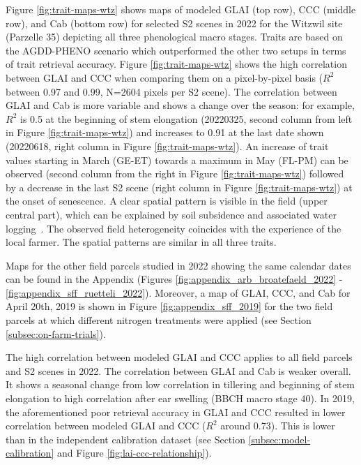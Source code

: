 Figure \ref{fig:trait-maps-wtz} shows maps of modeled GLAI (top row), CCC (middle row), and Cab (bottom row) for selected S2 scenes in 2022 for the Witzwil site (Parzelle 35) depicting all three phenological macro stages. Traits are based on the AGDD-PHENO scenario which outperformed the other two setups in terms of trait retrieval accuracy. Figure \ref{fig:trait-maps-wtz} shows the high correlation between GLAI and CCC when comparing them on a pixel-by-pixel basis ($R^2$ between 0.97 and 0.99, N=2604 pixels per S2 scene). The correlation between GLAI and Cab is more variable and shows a change over the season: for example, $R^2$ is 0.5 at the beginning of stem elongation (20220325, second column from left in Figure \ref{fig:trait-maps-wtz}) and increases to 0.91 at the last date shown (20220618, right column in Figure \ref{fig:trait-maps-wtz}). An increase of trait values starting in March (GE-ET) towards a maximum in May (FL-PM) can be observed (second column from the right in Figure \ref{fig:trait-maps-wtz}) followed by a decrease in the last S2 scene (right column in Figure \ref{fig:trait-maps-wtz}) at the onset of senescence. A clear spatial pattern is visible in the field (upper central part), which can be explained by soil subsidence and associated water logging~\citep{egli_landschaftsdynamik_2020}. The observed field heterogeneity coincides with the experience of the local farmer. The spatial patterns are similar in all three traits.

Maps for the other field parcels studied in 2022 showing the same calendar dates can be found in the Appendix (Figures \ref{fig:appendix_arb_broatefaeld_2022} - \ref{fig:appendix_sff_ruetteli_2022}). Moreover, a map of GLAI, CCC, and Cab for April 20th, 2019 is shown in Figure \ref{fig:appendix_sff_2019} for the two field parcels at which different nitrogen treatments were applied (see Section \ref{subsec:on-farm-trials}).

The high correlation between modeled GLAI and CCC applies to all field parcels and S2 scenes in 2022. The correlation between GLAI and Cab is weaker overall. It shows a seasonal change from low correlation in tillering and beginning of stem elongation to high correlation after ear swelling (BBCH macro stage 40). In 2019, the aforementioned poor retrieval accuracy in GLAI and CCC resulted in lower correlation between modeled GLAI and CCC ($R^2$ around 0.73). This is lower than in the independent calibration dataset (see Section \ref{subsec:model-calibration} and Figure \ref{fig:lai-ccc-relationship}).

